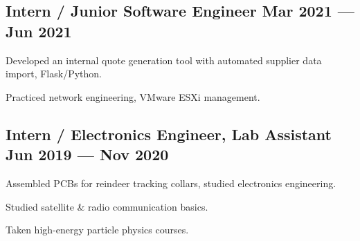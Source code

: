 \documentclass[letter,10pt]{article}
\begin{document}
\subsection{{Intern / Junior Software Engineer \hfill Mar 2021 --- Jun 2021}}
\begin{zitemize}
\item Developed an internal quote generation tool with automated supplier data import, Flask/Python.
\item Practiced network engineering, VMware ESXi management.
\end{zitemize}

\subsection{{Intern / Electronics Engineer, Lab Assistant \hfill Jun 2019 --- Nov 2020}}
\begin{zitemize}
\item Assembled PCBs for reindeer tracking collars, studied electronics engineering.
\item Studied satellite \& radio communication basics.
\item Taken high-energy particle physics courses.
\end{zitemize}
\end{document}

